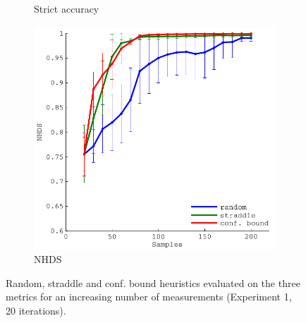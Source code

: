\documentclass[11pt]{article} %
\begin{document}
\begin{figure}[tb]
\begin{subfigure}[b]{0.329\textwidth}
    \caption{Strict accuracy}
  \end{subfigure}
  \hfill
  \begin{subfigure}[b]{0.329\textwidth}
    \centering
    \includegraphics[width=\textwidth]{figures/sin2d_hd}
    \caption{NHDS}
  \end{subfigure}
  \caption{Random, straddle and conf. bound heuristics evaluated on the three
           metrics for an increasing number of measurements
           (Experiment 1, 20 iterations).}
  \label{fig:sin2d_eval}
\end{figure}
\end{document}

